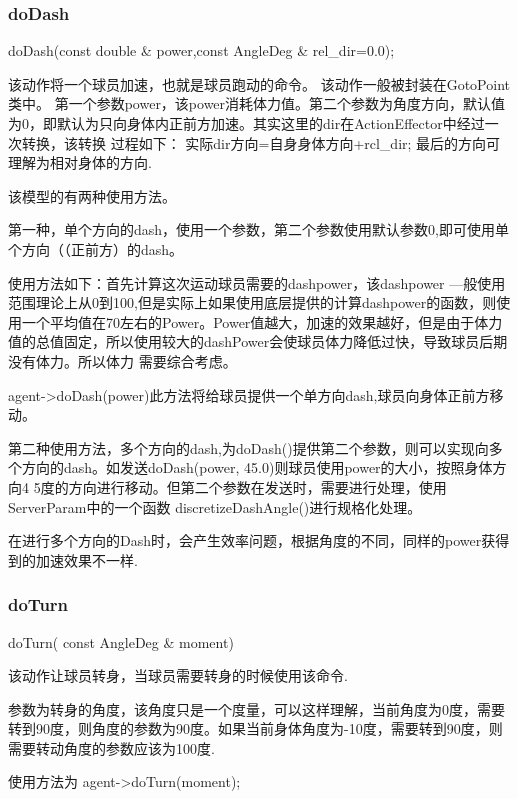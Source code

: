 \subsubsection{doDash}

\begin{Code}
	doDash(const double & power,const AngleDeg & rel_dir=0.0);
\end{Code}
该动作将一个球员加速，也就是球员跑动的命令。
该动作一般被封装在GotoPoint类中。
第一个参数power，该power消耗体力值。第二个参数为角度方向，默认值为0，即默认为只向身体内正前方加速。其实这里的dir在ActionEffector中经过一次转换，该转换
过程如下：
实际dir方向=自身身体方向+rcl_dir;
最后的方向可理解为相对身体的方向.

该模型的有两种使用方法。

第一种，单个方向的dash，使用一个参数，第二个参数使用默认参数0,即可使用单个方向（（正前方）的dash。

使用方法如下：首先计算这次运动球员需要的dashpower，该dashpower —般使用范围理论上从0到100,但是实际上如果使用底层提供的计算dashpower的函数，则使用一个平均值在70左右的Power。Power值越大，加速的效果越好，但是由于体力值的总值固定，所以使用较大的dashPower会使球员体力降低过快，导致球员后期没有体力。所以体力
需要综合考虑。

agent->doDash(power)此方法将给球员提供一个单方向dash,球员向身体正前方移动。

第二种使用方法，多个方向的dash,为doDash()提供第二个参数，则可以实现向多个方向的dash。如发送doDash(power, 45.0)则球员使用power的大小，按照身体方向4 5度的方向进行移动。但第二个参数在发送时，需要进行处理，使用ServerParam中的一个函数 discretizeDashAngle()进行规格化处理。

在进行多个方向的Dash时，会产生效率问题，根据角度的不同，同样的power获得到的加速效果不一样.

\subsubsection{doTurn}

	\begin{Code}
	doTurn( const AngleDeg & moment)	
	\end{Code}
	
该动作让球员转身，当球员需要转身的时候使用该命令.

参数为转身的角度，该角度只是一个度量，可以这样理解，当前角度为0度，需要转到90度，则角度的参数为90度。如果当前身体角度为-10度，需要转到90度，则需要转动角度的参数应该为100度.

使用方法为 agent->doTurn(moment);

